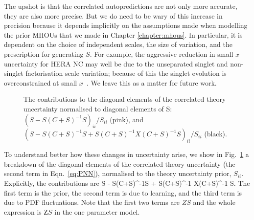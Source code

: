 The upshot is that the correlated autopredictions are not only more accurate, they are also more precise. But we do need to be wary of this increase in precision because it depends implicitly on the assumptions made when modelling the prior MHOUs that we made in Chapter \ref{chapter:mhous}. In particular, it is dependent on the choice of independent scales, the size of variation, and the prescription for generating $S$. For example, the aggressive reduction in small $x$ uncertainty for HERA NC may well be due to the unseparated singlet and non-singlet factorisation scale variation; because of this the singlet evolution is overconstrained at small $x$~\cite{Harland-Lang:2018bxd}. We leave this as a matter for future work.

\begin{figure}[H]
    \begin{center}
    \end{center}
  \vspace{-0.55cm}
  \caption{The contributions to the diagonal elements of the correlated theory uncertainty normalised to diagonal elements of S: $(S-S(C+S)^{-1}S)_{ii}/S_{ii}$ (pink), and  $(S-S(C+S)^{-1}S+S(C+S)^{-1}X(C+S)^{-1}S )_{ii}/S_{ii}$ (black).}
  \label{fig:Scpts}
\end{figure}

To understand better how these changes in uncertainty arise, we show in Fig.~\ref{fig:Scpts} a breakdown of the diagonal elements of the correlated theory uncertainty (the second term in Eqn.~\ref{eq:PNN}), normalised to the theory uncertainty prior, $S_{ii}$. Explicitly, the contributions are 
\be 
S - S(C+S)^{-1}S + S(C+S)^{-1} X(C+S)^{-1} S.
\ee
The first term is the prior, the second term is due to learning, and the third term is due to PDF fluctuations. Note that the first two terms are $ZS$ and the whole expression is $\Zbar S$ in the one parameter model. 

